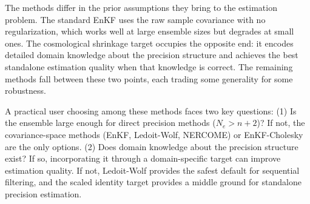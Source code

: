 The methods differ in the prior assumptions they bring to the estimation problem. The standard EnKF uses the raw sample covariance with no regularization, which works well at large ensemble sizes but degrades at small ones. The cosmological shrinkage target occupies the opposite end: it encodes detailed domain knowledge about the precision structure and achieves the best standalone estimation quality when that knowledge is correct. The remaining methods fall between these two points, each trading some generality for some robustness.

A practical user choosing among these methods faces two key questions: (1) Is the ensemble large enough for direct precision methods ($N_e > n + 2$)? If not, the covariance-space methods (EnKF, Ledoit-Wolf, NERCOME) or EnKF-Cholesky are the only options. (2) Does domain knowledge about the precision structure exist? If so, incorporating it through a domain-specific target can improve estimation quality. If not, Ledoit-Wolf provides the safest default for sequential filtering, and the scaled identity target provides a middle ground for standalone precision estimation.
